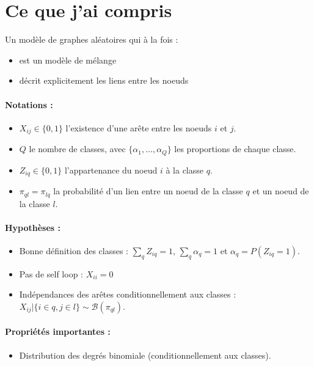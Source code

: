 \section{Ce que j'ai compris}

Un modèle de graphes  aléatoires qui à la fois :
\begin{itemize}
    \item est un modèle de mélange
    \item décrit explicitement les liens entre les noeuds
\end{itemize}

\paragraph{Notations :}
\begin{itemize}
    \item $X_{ij}\in \{0,1\}$ l'existence d'une arête entre les noeuds $i$ et $j$.
    \item $Q$ le nombre de classes, avec $\{\alpha_1, \dots, \alpha_Q\}$ les proportions de chaque classe.
    \item $Z_{iq} \in \{0,1\}$ l'appartenance du noeud $i$ à la classe $q$.
    \item $\pi_{ql}=\pi_{lq}$ la probabilité d'un lien entre un noeud de la classe $q$ et un noeud de la classe $l$.
\end{itemize}

\paragraph{Hypothèses :}
\begin{itemize}
    \item Bonne définition des classes : $\sum_q Z_{iq}=1$, $\sum_q \alpha_q=1$ et $\alpha_q=P(Z_{iq}=1)$.
    \item Pas de self loop : $X_{ii}=0$
    \item Indépendances des arêtes conditionnellement aux classes : $X_{ij}| \{i\in q, j\in l\} \sim \mathcal{B}(\pi_{ql})$.
\end{itemize}

\paragraph{Propriétés importantes :}
\begin{itemize}
    \item Distribution des degrés binomiale (conditionnellement aux classes).
\end{itemize}

